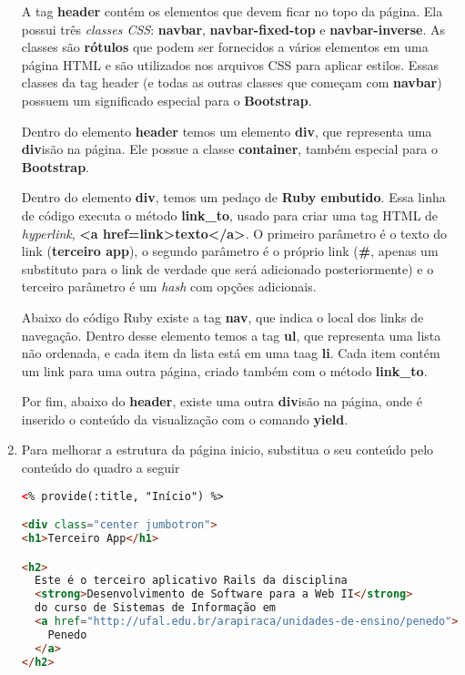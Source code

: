 \documentclass[a4paper,12pt]{article}
\begin{document}
\begin{enumerate}
  A tag \textbf{header} contém os elementos que devem ficar no topo da página. Ela possui três \textit{classes CSS}: \textbf{navbar}, \textbf{navbar-fixed-top} e \textbf{navbar-inverse}. As classes são \textbf{rótulos} que podem ser fornecidos a vários elementos em uma página HTML e são utilizados nos arquivos CSS para aplicar estilos. Essas classes da tag header (e todas as outras classes que começam com \textbf{navbar}) possuem um significado especial para o \textbf{Bootstrap}.

  Dentro do elemento \textbf{header} temos um elemento \textbf{div}, que representa uma \textbf{div}isão na página. Ele possue a classe \textbf{container}, também especial para o \textbf{Bootstrap}.

  Dentro do elemento \textbf{div}, temos um pedaço de \textbf{Ruby embutido}. Essa linha de código executa o método \textbf{link\_to}, usado para criar uma tag HTML de \textit{hyperlink}, \textbf{<a href=\textquotesingle link\textquotesingle>texto</a>}. O primeiro parâmetro é o texto do link (\textbf{\textquotesingle terceiro app\textquotesingle}), o segundo parâmetro é o próprio link (\textbf{\textquotesingle \#\textquotesingle}, apenas um substituto para o link de verdade que será adicionado posteriormente) e o terceiro parâmetro é um \textit{hash} com opções adicionais.

  Abaixo do código Ruby existe a tag \textbf{nav}, que indica o local dos links de navegação. Dentro desse elemento temos a tag \textbf{ul}, que representa uma lista não ordenada, e cada item da lista está em uma taag \textbf{li}. Cada item contém um link para uma outra página, criado também com o método \textbf{link\_to}.

  Por fim, abaixo do \textbf{header}, existe uma outra \textbf{div}isão na página, onde é inserido o conteúdo da visualização com o comando \textbf{yield}.

  \item Para melhorar a estrutura da página inicio, substitua o seu conteúdo pelo conteúdo do quadro a seguir
  \begin{lstlisting}[language=html, title={app/views/paginas\_estaticas/inicio.html.erb}, basicstyle=\scriptsize]
<% provide(:title, "Início") %>

<div class="center jumbotron">
<h1>Terceiro App</h1>

<h2>
  Este é o terceiro aplicativo Rails da disciplina
  <strong>Desenvolvimento de Software para a Web II</strong>
  do curso de Sistemas de Informação em
  <a href="http://ufal.edu.br/arapiraca/unidades-de-ensino/penedo">
    Penedo
  </a>
</h2>


\end{lstlisting}
\end{enumerate}
\end{document}
